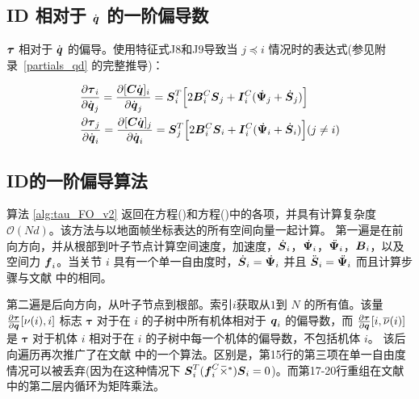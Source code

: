 \documentclass[letterpaper, 10 pt, conference]{ieeetran}  %
\begin{document}
\subsection{ID 相对于 $\dot{\boldsymbol{q}}$ 的一阶偏导数}

$\boldsymbol{\tau}$ 相对于 $\dot{\boldsymbol{q}}$ 的偏导。使用特征式J8和J9导致当 $j \preceq i$ 情况时的表达式(参见附录~\ref{partials_qd} 的完整推导)：

\begin{equation}
    \begin{aligned}
    & \frac{\partial \red{\taubar_{i}}}{\partial \red{\dot{\q}_{j}}} =\frac{\partial [\C  \qd]_{i}}{ \partial \red{\dot{\q}_{j}}} = \red{\Phibar_{i}^{T} \Big[2 \B_{i}^{C} \Phibar_{j} +  \I_{i}^{C} (    \Psibardot_{j} + \Phibardot_{j} ) \Big]  }\\
    & \frac{\partial \red{\taubar_{j}}}{\partial \red{\dot{\q}_{i}}} =\frac{\partial [\C  \qd]_{j}}{ \partial \red{\dot{\q}_{i}}} = \red{\Phibar_{j}^{T} \Big[2 \B_{i}^{C} \Phibar_{i} +  \I_{i}^{C} (    \Psibardot_{i} + \Phibardot_{i} ) \Big]  (j \neq i)}
\label{Cqdot_FO_qdot_eqn}
    \end{aligned}
\end{equation}

\subsection{ID的一阶偏导算法}
算法 \ref{alg:tau_FO_v2} 返回在方程(\red{\ref{IDFO_SVA_eq1}})和方程(\red{\ref{Cqdot_FO_qdot_eqn}})中的各项，并具有计算复杂度 $\mathcal{O}(Nd)$。该方法与以地面帧坐标表达的所有空间向量一起计算。
第一遍是在前向方向，并从根部到叶子节点计算空间速度，加速度，$\,\dot{\!\boldsymbol{S}}_{i}$，$\,\dot{\!\boldsymbol{\Psi}}_{i}$，$\,\ddot{\!\boldsymbol{\Psi}}_{i}$，$\boldsymbol{B}{}_{i}$，以及空间力 $\boldsymbol{f}_{i}$。当关节 $i$ 具有一个单一自由度时，$\,\dot{\!\boldsymbol{S}}_i = \,\dot{\!\boldsymbol{\Psi}}_i$ 并且 $\ddot{\boldsymbol{S}}_i =\,\ddot{\!\boldsymbol{\Psi}}_{i}$ 而且计算步骤与文献 \cite[Alg.~2]{jain} 中的相同。

第二遍是后向方向，从叶子节点到根部。索引$i$获取从$1$到 $N$ 的所有值。该量 $\frac{\partial \boldsymbol\tau}{\partial \boldsymbol{q}}[\nu(i), i]$ 标志 $\boldsymbol\tau$ 对于在 $i$ 的子树中所有机体相对于 $\boldsymbol{q}_{i}$ 的偏导数，而 $\frac{\partial \boldsymbol\tau}{\partial \boldsymbol{q}}[i, \overline{\nu}(i)]$ 是 $\boldsymbol\tau$ 对于机体 $i$ 相对于在 $i$ 的子树中每一个机体的偏导数，不包括机体 $i$。 %
该后向遍历再次推广了在文献 \cite[Alg.~2]{jain} 中的一个算法。区别是，第15行的第三项在单一自由度情况可以被丢弃(因为在这种情况下 $ {\boldsymbol{S}}_i^T (\boldsymbol{f}_i^C \,\overline{\!\times\!}{}^{\,*}) {\boldsymbol{S}}_i =0$)。而第17-20行重组在文献 \cite{jain} 中的第二层内循环为矩阵乘法。
\end{document}
